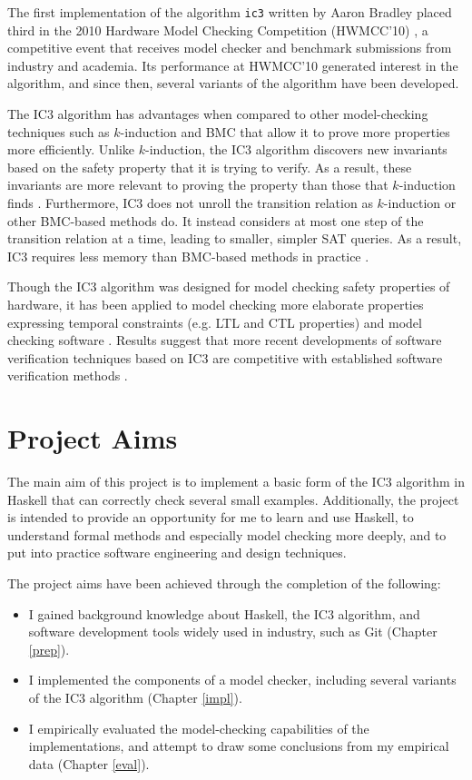 \documentclass[12pt,a4paper,twoside,openright]{report}
\begin{document}
The first implementation of the algorithm \verb,ic3, written by Aaron Bradley placed third in
the 2010 Hardware Model Checking Competition (HWMCC'10) \cite{hwmcc10},
a competitive event that receives model checker and benchmark submissions from
industry and
academia. Its performance at HWMCC'10 generated interest in the algorithm, and
since then, several variants of the algorithm have been developed.

The IC3 algorithm has advantages when compared to other model-checking
techniques such as $k$-induction and BMC that allow it to prove more
properties more efficiently. Unlike $k$-induction, the IC3 algorithm
discovers new invariants based on the safety property that it is trying to
verify. As a result, these
invariants are more relevant to proving the property than those that
$k$-induction finds \cite{bradley12}.
Furthermore, IC3 does not unroll the transition relation as $k$-induction
or other BMC-based methods do. It instead considers at most one step
of the transition relation at a time, leading to smaller,
simpler SAT queries. As a result, IC3 requires less memory than BMC-based
methods in practice \cite{bradley12}.


Though the IC3 algorithm was designed for model checking safety properties of hardware,
it has been applied to model checking more
elaborate properties expressing temporal constraints (e.g. LTL and CTL
properties) and model checking software
\cite{bradley12,cimatti12}.
Results suggest that more recent developments of software verification
techniques based on IC3 are competitive with
established software verification methods \cite{birgmeier14}.

\section{Project Aims}

The main aim of this project is to implement a basic form of the IC3 algorithm in
Haskell that can correctly check several
small examples. Additionally, the project is intended to provide an opportunity
for me to learn and use Haskell, to understand formal methods and especially model
checking more deeply, and to put into practice software engineering and design techniques.

The project aims have been achieved through the completion of the following:
\begin{itemize}
\item I gained background knowledge about Haskell, the IC3 algorithm, and software
development tools widely used in industry, such as Git (Chapter \ref{prep}).
\item I implemented the components of a model checker, including several variants of
the IC3 algorithm (Chapter \ref{impl}).
\item I empirically evaluated the model-checking capabilities of the implementations,
and attempt to draw some conclusions from my empirical data
(Chapter \ref{eval}).
\end{itemize}
\end{document}
